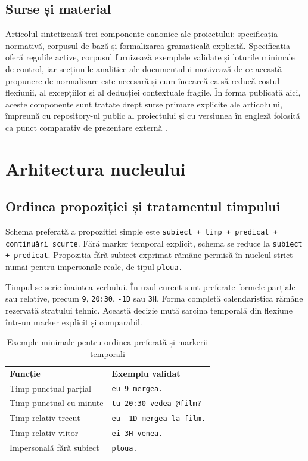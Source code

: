 \documentclass[12pt,onecolumn,letterpaper]{article}
\newcommand{\rs}[1]{\texttt{#1}}
\newcommand{\RStablelayout}{%
\footnotesize
\setlength{\tabcolsep}{6pt}%
\renewcommand{\arraystretch}{1.12}%
\arrayrulecolor{RSRule}%
}
\begin{document}
\subsection{Surse și material}

Articolul sintetizează trei componente canonice ale proiectului: specificația
normativă, corpusul de bază și formalizarea gramaticală explicită. Specificația
oferă regulile active, corpusul furnizează exemplele validate și loturile
minimale de control, iar secțiunile analitice ale documentului motivează de ce
această propunere de normalizare este necesară și cum încearcă ea să reducă
costul flexiunii, al excepțiilor și al deducției contextuale fragile. În forma
publicată aici, aceste componente sunt tratate drept surse primare explicite ale
articolului, împreună cu repository-ul public al proiectului și cu versiunea în
engleză folosită ca punct comparativ de prezentare externă
\cite{rs-spec,rs-corpus,rs-eval,rs-prez,rs-readme,rs-repo,minenglish}.

\section{Arhitectura nucleului}

\subsection{Ordinea propoziției și tratamentul timpului}

Schema preferată a propoziției simple este \rs{subiect + timp + predicat +
continuări scurte}. Fără marker temporal explicit, schema se reduce la
\rs{subiect + predicat}. Propoziția fără subiect exprimat rămâne permisă în
nucleul strict numai pentru impersonale reale, de tipul \rs{ploua.}

Timpul se scrie înaintea verbului. În uzul curent sunt preferate formele parțiale
sau relative, precum \rs{9}, \rs{20:30}, \rs{-1D} sau \rs{3H}. Forma completă
calendaristică rămâne rezervată stratului tehnic. Această decizie mută sarcina
temporală din flexiune într-un marker explicit și comparabil.

\begin{table}[h!]
\centering
\RStablelayout
\begin{tabularx}{\linewidth}{@{}lY@{}}
\textbf{Funcție} & \textbf{Exemplu validat} \\
Timp punctual parțial & \rs{eu 9 mergea.} \\
Timp punctual cu minute & \rs{tu 20:30 vedea @film?} \\
Timp relativ trecut & \rs{eu -1D mergea la film.} \\
Timp relativ viitor & \rs{ei 3H venea.} \\
Impersonală fără subiect & \rs{ploua.} \\
\bottomrule
\end{tabularx}
\caption{Exemple minimale pentru ordinea preferată și markerii temporali}
\end{table}
\end{document}
